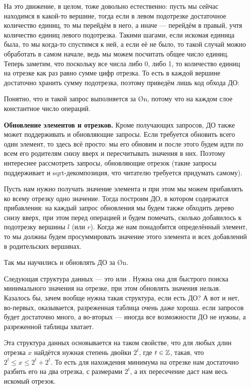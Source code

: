 {На это движение, в целом, тоже довольно естественно: пусть мы сейчас находимся в какой-то вершине, тогда если в левом подотрезке достаточное количество единиц, то мы перейдём в него, а иначе — перейдём в правый, учтя количество единиц левого подотрезка. Такими шагами, если искомая единица была, то мы когда-то спустимся к ней, а если её не было, то такой случай можно обработать в самом начале, ведь мы можем посчитать общее число единиц. 
Теперь заметим, что поскольку все числа либо 0, либо 1, то количество единиц на отрезке как раз равно сумме цифр отрезка. То есть в каждой вершине достаточно хранить сумму подотрезка, поэтому приведём лишь код обхода ДО:


Понятно, что и такой запрос выполняется за \O{\log n}, потому что на каждом слое константное число операций.

\textbf{Обновление элементов и отрезков.} Кроме получающих запросов, ДО также может поддерживать и обновляющие запросы. Если требуется обновить всего один элемент, то здесь всё просто: мы его обновим и после этого будем идти по всем его родителям снизу вверх и пересчитывать значения в них. Поэтому интереснее рассмотреть запросы, обновляющие отрезок (такие запросы поддерживает и sqrt-декомпозиция, что читателю требуется придумать самому).

Пусть нам нужно получать значение элемента и при этом мы можем прибавлять ко всему отрезку одно значение. Тогда построим ДО, в котором содержатся прибавления: на каждый запрос обновления мы будем также обходить дерево снизу вверх, при этом перед операцией  и  будем помечать, сколько добавилось к подотрезку вершины $l$ (или $r$). Когда же нам понадобится определённый элемент, то мы должны будем просуммировать значение этого элемента и всех добавлений в родительских вершинах. 

Так мы научились и обновлять ДО за \O{\log n}.


Следующая структура данных — это  или . Нужна она для быстрого поиска минимального значения на отрезке, при этом обновлять значения нельзя. Казалось бы, зачем вообще нужна такая структура, если есть ДО? А вот и нет, во-первых, оказывается, разреженная таблица очень даже хороша. если запросов будет достаточно много, а во-вторых — иногда все возможности ДО не нужны, а разреженной таблицы хватает.

Эта структура данных основывается на таком свойстве, что для любых длин отрезка $x$ найдётся нужная степень двойки $2^t$, где $t \in \mathbb{Z}$, такая, что $2^t \leq x \leq 2^t + 2^t$. То есть для нахождения минимума на отрезке нам достаточно разбить его на два отрезка, с размерами $2^t$, а их пересечение даст нам весь искомый отрезок.

}
